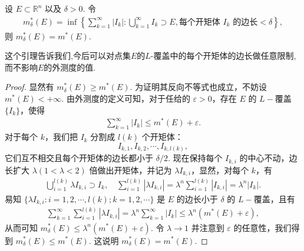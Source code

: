 \documentclass[../../main.tex]{subfiles}
\begin{document}
\begin{lemma}
设 \(E \subset \mathbb{R}^n\) 以及 \(\delta > 0\). 令
\begin{align*}
m^*_{\delta}(E) = \inf\left\{ \sum_{k = 1}^{\infty} |I_k| : \bigcup_{k = 1}^{\infty} I_k \supset E, \text{每个开矩体 } I_k \text{ 的边长} < \delta \right\},
\end{align*}
则 \(m^*_{\delta}(E)=m^*(E)\).
\end{lemma}
\begin{note}
这个引理告诉我们,今后可以对点集$E$的$L$-覆盖中的每个开矩体的边长做任意限制,而不影响$E$的外测度的值.
\end{note}
\begin{proof}
显然有 \(m^*_{\delta}(E) \geqslant  m^*(E)\). 为证明其反向不等式也成立，不妨设 \(m^*(E)< + \infty\). 由外测度的定义可知，对于任给的 \(\varepsilon > 0\)，存在 \(E\) 的 \(L -\)覆盖 \(\{I_k\}\)，使得
\begin{align*}
\sum_{k = 1}^{\infty} |I_k| \leqslant  m^*(E) + \varepsilon.
\end{align*}
对于每个 \(k\)，我们把 \(I_k\) 分割成 \(l(k)\) 个开矩体：
\[
I_{k,1}, I_{k,2}, \cdots, I_{k,l(k)},
\]
它们互不相交且每个开矩体的边长都小于 \(\delta/2\). 现在保持每个 \(I_{k,i}\) 的中心不动，边长扩大 \(\lambda(1 < \lambda < 2)\) 倍做出开矩体，并记为 \(\lambda I_{k,i}\)，显然，对每个 \(k\)，有
\begin{align*}
\bigcup_{i = 1}^{l(k)} \lambda I_{k,i} \supset I_k, \quad \sum_{i = 1}^{l(k)} |\lambda I_{k,i}| = \lambda^n \sum_{i = 1}^{l(k)} |I_{k,i}| = \lambda^n |I_k|.
\end{align*}
易知 \(\{\lambda I_{k,i} : i = 1,2,\cdots, l(k); k = 1,2,\cdots\}\) 是 \(E\) 的边长小于 \(\delta\) 的 \(L -\)覆盖，且有
\begin{align*}
\sum_{k = 1}^{\infty} \sum_{i = 1}^{l(k)} |\lambda I_{k,i}| = \lambda^n \sum_{k = 1}^{\infty} |I_k| \leqslant  \lambda^n (m^*(E) + \varepsilon),
\end{align*}
从而可知 \(m^*_{\delta}(E) \leqslant  \lambda^n (m^*(E) + \varepsilon)\). 令 \(\lambda \to 1\) 并注意到 \(\varepsilon\) 的任意性，我们得到 \(m^*_{\delta}(E) \leqslant  m^*(E)\). 这说明 \(m^*_{\delta}(E)=m^*(E)\).

\end{proof}
\end{document}
